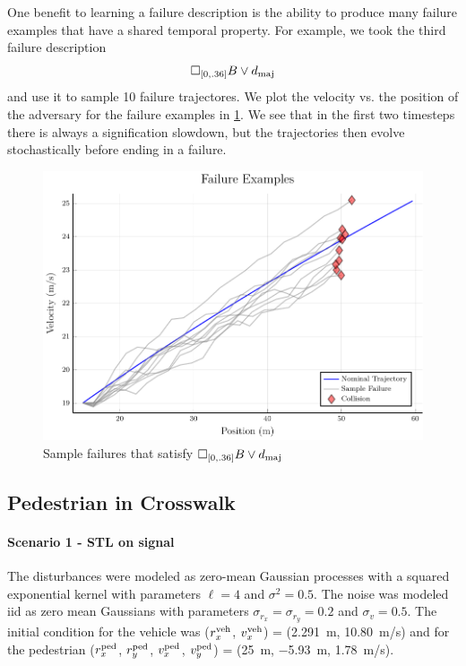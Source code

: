 One benefit to learning a failure description is the ability to produce many failure examples that have a shared temporal property. For example, we took the third failure description
\begin{equation}
    \square_{[0, .36]} B \lor d_{\rm maj}
\end{equation}
and use it to sample \num{10} failure trajectores. We plot the velocity vs. the position of the adversary for the failure examples in \cref{fig:2car_failure_samples}. We see that in the first two timesteps there is always a signification slowdown, but the trajectories then evolve stochastically before ending in a failure. 

\begin{figure}
    \centering
    \includegraphics[scale=0.6]{figures/interpretable_validation/2car_sample_failures.pdf}
    \caption{Sample failures that satisfy $\square_{[0, .36]} B \lor d_{\rm maj}$}
    \label{fig:2car_failure_samples}
\end{figure}


\subsection{Pedestrian in Crosswalk}

\paragraph{Scenario 1 - STL on signal}

The disturbances were modeled as zero-mean Gaussian processes with a squared exponential kernel with parameters $\ell = 4$ and $\sigma^2 = 0.5$. The noise was modeled iid as zero mean Gaussians with parameters $\sigma_{r_x} = \sigma_{r_y} = 0.2$ and $\sigma_{v} = 0.5$. The initial condition for the vehicle was ($r_x^{\rm veh}$, $v_x^{\rm veh}$) = (\SI{2.291}{m}, \SI{10.80}{m/s}) and for the pedestrian ($r^{\rm ped}_x$, $r^{\rm ped}_y$, $v^{\rm ped}_x$, $v^{\rm ped}_y$) = (\SI{25}{m}, \SI{-5.93}{m}, \SI{1.78}{m/s}). 


